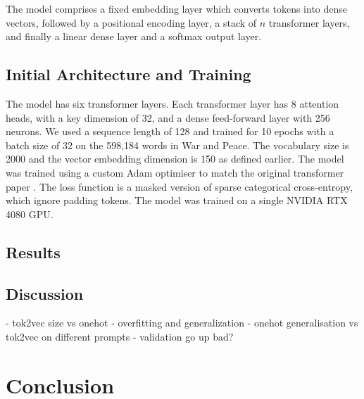 \documentclass[a4paper, 11pt]{article}
\begin{document}
The model comprises a fixed embedding layer which converts tokens into dense vectors, followed by a positional encoding layer, a stack of $n$ transformer layers, and finally a linear dense layer and a softmax output layer.

\subsection{Initial Architecture and Training}
The model has six transformer layers. Each transformer layer has 8 attention heads, with a key dimension of 32, and a dense feed-forward layer with 256 neurons. We used a sequence length of 128 and trained for 10 epochs with a batch size of 32 on the 598,184 words in War and Peace. The vocabulary size is 2000 and the vector embedding dimension is 150 as defined earlier. The model was trained using a custom Adam optimiser to match the original transformer paper \cite{vaswani2017attention}. The loss function is a masked version of sparse categorical cross-entropy, which ignore padding tokens. The model was trained on a single NVIDIA RTX 4080 GPU.

\subsection{Results}

\subsection{Discussion}

- tok2vec size vs onehot
- overfitting and generalization
- onehot generalisation vs tok2vec on different prompts
- validation go up bad?


\section{Conclusion}



\end{document}
